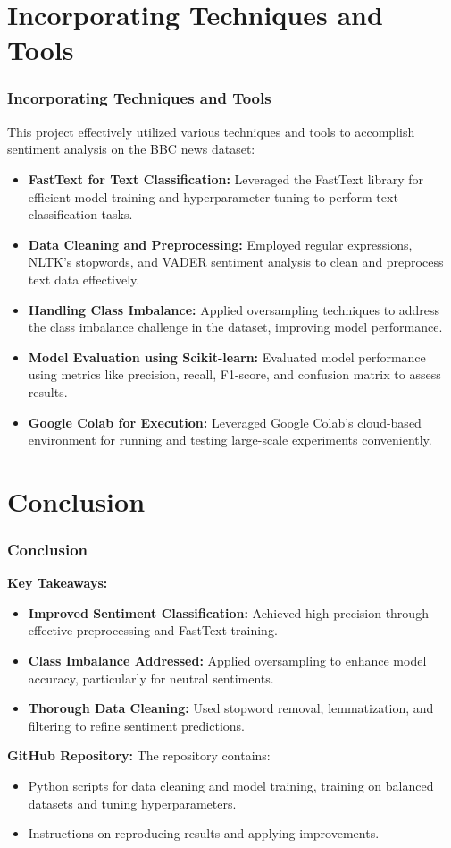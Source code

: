 \documentclass{beamer}
\begin{document}
\section{Incorporating Techniques and Tools}
\begin{frame}
    \frametitle{Incorporating Techniques and Tools}
    This project effectively utilized various techniques and tools to accomplish sentiment analysis on the BBC news dataset:

    \begin{itemize}
        \item \textbf{FastText for Text Classification:} Leveraged the FastText library for efficient model training and hyperparameter tuning to perform text classification tasks.
        \item \textbf{Data Cleaning and Preprocessing:} Employed regular expressions, NLTK’s stopwords, and VADER sentiment analysis to clean and preprocess text data effectively.
        \item \textbf{Handling Class Imbalance:} Applied oversampling techniques to address the class imbalance challenge in the dataset, improving model performance.
        \item \textbf{Model Evaluation using Scikit-learn:} Evaluated model performance using metrics like precision, recall, F1-score, and confusion matrix to assess results.
        \item \textbf{Google Colab for Execution:} Leveraged Google Colab’s cloud-based environment for running and testing large-scale experiments conveniently.
    \end{itemize}
\end{frame}
\section{Conclusion}
\begin{frame}
    \frametitle{Conclusion}
    \textbf{Key Takeaways:}
    \begin{itemize}
\begin{itemize}
    \item \textbf{Improved Sentiment Classification:} Achieved high precision through effective preprocessing and FastText training.
    \item \textbf{Class Imbalance Addressed:} Applied oversampling to enhance model accuracy, particularly for neutral sentiments.
    \item \textbf{Thorough Data Cleaning:} Used stopword removal, lemmatization, and filtering to refine sentiment predictions.
\end{itemize}
    \end{itemize}

    \vspace{0.4cm}
    \textbf{GitHub Repository:}
    The repository contains:
    \begin{itemize}
        \item Python scripts for data cleaning and model training, training on balanced datasets and tuning hyperparameters.
        \item Instructions on reproducing results and applying improvements.
    \end{itemize}
\end{frame}
\end{document}
